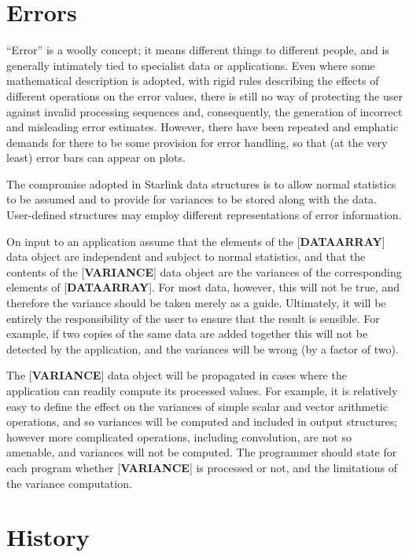 \documentclass[twoside,11pt]{article}
\newcommand{\xlabel}[1]{}
\renewcommand{\_}{\texttt{\symbol{95}}}
\begin{document}
\section{\xlabel{se_errors}Errors\label{se:errors}}

``Error'' is a woolly concept;  it means different things to different
people, and is generally intimately tied to specialist data or
applications.  Even where some mathematical description is adopted,
with rigid rules describing the effects of different operations
on the error values, there is still no way of protecting the
user against invalid processing sequences and,
consequently, the generation of
incorrect and misleading error estimates.
However, there have been repeated and emphatic demands for there
to be some provision for error handling,
so that (at the very least) error bars can appear on plots.

The compromise adopted
in Starlink data structures is to allow
normal statistics to be assumed and to provide for
variances to be stored along with the data.  User-defined
structures may employ different representations of error
information.

On input to an application assume that the elements of the
{[}{\bf DATA\_ARRAY}{]} data object are independent and subject to
normal statistics, and that the contents of the {[}{\bf VARIANCE}{]}
data object are the variances of the corresponding elements of
{[}{\bf DATA\_ARRAY}{]}.
For most data, however, this will not be true, and therefore
the variance should be taken merely as a guide.  Ultimately, it will be
entirely the responsibility of the user to ensure that the result is
sensible.  For example, if two copies of the same data are added
together this will not be detected by the application, and
the variances will be wrong (by a factor of two).

The {[}{\bf VARIANCE}{]} data object will
be propagated in cases where the application can 
readily compute its processed values.  For example, it is relatively
easy to define the effect on the variances of
simple scalar and vector arithmetic operations, and so
variances will be computed and included
in output structures;  however more complicated operations,
including convolution, are not so amenable, and variances
will not be computed.  The programmer
should state for each program whether {[}{\bf VARIANCE}{]} is
processed or not, and the limitations of the variance computation.

\section{History}
\end{document}

